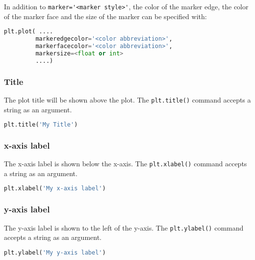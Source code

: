 \documentclass{book}
\newcommand{\passthrough}[1]{#1}
\begin{document}
In addition to \passthrough{\lstinline!marker='<marker style>'!}, the
color of the marker edge, the color of the marker face and the size of
the marker can be specified with:

\begin{lstlisting}[language=Python]
plt.plot( .... 
         markeredgecolor='<color abbreviation>',
         markerfacecolor='<color abbreviation>',
         markersize=<float or int>
         ....)
\end{lstlisting}
    




    
        \hypertarget{title}{%
\subsubsection{Title}\label{title}}

The plot title will be shown above the plot. The
\passthrough{\lstinline!plt.title()!} command accepts a string as an
argument.

\begin{lstlisting}[language=Python]
plt.title('My Title')
\end{lstlisting}
    




    
        \hypertarget{x-axis-label}{%
\subsubsection{x-axis label}\label{x-axis-label}}

The x-axis label is shown below the x-axis. The
\passthrough{\lstinline!plt.xlabel()!} command accepts a string as an
argument.

\begin{lstlisting}[language=Python]
plt.xlabel('My x-axis label')
\end{lstlisting}
    




    
        \hypertarget{y-axis-label}{%
\subsubsection{y-axis label}\label{y-axis-label}}

The y-axis label is shown to the left of the y-axis. The
\passthrough{\lstinline!plt.ylabel()!} command accepts a string as an
argument.

\begin{lstlisting}[language=Python]
plt.ylabel('My y-axis label')
\end{lstlisting}
    
\end{document}
